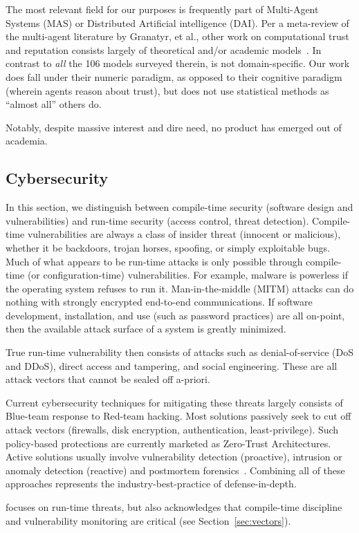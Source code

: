 The most relevant field for our purposes is frequently part of Multi-Agent Systems (MAS) or Distributed Artificial intelligence (DAI).
Per a meta-review of the multi-agent literature by Granatyr, et al., other work on computational trust and reputation consists largely of theoretical and/or academic models~\cite{granatyr2015trust}.
In contrast to \emph{all} the 106 models surveyed therein, \projectName is not domain-specific.
Our work does fall under their numeric paradigm, as opposed to their cognitive paradigm (wherein agents reason about trust), but does not use statistical methods as ``almost all'' others do.

Notably, despite massive interest and dire need, no product has emerged out of academia.


\subsection{Cybersecurity}\label{subsec:cyber}

In this section, we distinguish between compile-time security (software design and vulnerabilities) and run-time security (access control, threat detection).
Compile-time vulnerabilities are always a class of insider threat (innocent or malicious), whether it be backdoors, trojan horses, spoofing, or simply exploitable bugs.
Much of what appears to be run-time attacks is only possible through compile-time (or configuration-time) vulnerabilities.
For example, malware is powerless if the operating system refuses to run it.
Man-in-the-middle (MITM) attacks can do nothing with strongly encrypted end-to-end communications.
If software development, installation, and use (such as password practices) are all on-point, then the available attack surface of a system is greatly minimized.

True run-time vulnerability then consists of attacks such as denial-of-service (DoS and DDoS), direct access and tampering, and social engineering.
These are all attack vectors that cannot be sealed off a-priori.

Current cybersecurity techniques for mitigating these threats largely consists of Blue-team response to Red-team hacking.
Most solutions passively seek to cut off attack vectors (firewalls, disk encryption, authentication, least-privilege).
Such policy-based protections are currently marketed as Zero-Trust Architectures.
Active solutions usually involve vulnerability detection (proactive), intrusion or anomaly detection (reactive) and postmortem forensics~\cite{anderson2020security, brooks2018cybersecurity, wittkop2022cybersecurity}.
Combining all of these approaches represents the industry-best-practice of defense-in-depth.

\projectName focuses on run-time threats, but also acknowledges that compile-time discipline and vulnerability monitoring are critical (see Section~\ref{sec:vectors}).